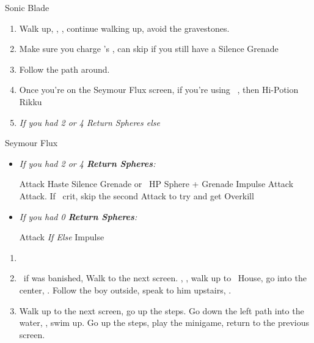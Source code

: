 \begin{multicols}{2}
\begin{equip}
  \begin{itemize}
    \auronf Sonic Blade
  \end{itemize}
\end{equip}
\begin{enumerate}[resume]
  \item Walk up, \sd, \cs[1:20], continue walking up, avoid the gravestones.
  \item Make sure you charge \rikku's \od, can skip if you still have a Silence Grenade
  \item Follow the path around.
  \item Once you're on the Seymour Flux screen, if you're using \rikku\ \od, then Hi-Potion Rikku
   \item \formation{\tidus}{\yuna}{\auron} \textit{If you had 2 or 4 Return Spheres else } \formation{\tidus}{\kimahri}{\wakka}
\end{enumerate}
\begin{battle}[70000]{Seymour Flux}
  \begin{itemize}
    \item \textit{If you had 2 or 4 \textbf{Return Spheres}:}
          \begin{itemize}
            \yunaf Attack
            \tidusf Haste \yuna
            \switch{\auron}{\rikku}
            \rikkuf Silence Grenade or \od\ HP Sphere + Grenade
            \summon{\bahamut}
            \bahamutf Impulse
            \yunaf Attack
            \tidusf Attack. If \yuna\ crit, skip the second Attack to try and get Overkill
          \end{itemize}
    \item \textit{If you had 0 \textbf{Return Spheres}:}
          \begin{itemize}
            \switch{\tidus}{\yuna}
            \summon{\bahamut}
            \bahamutf Attack \textit{If \blitzwin Else} Impulse
          \end{itemize}
  \end{itemize}
\end{battle}
\begin{enumerate}[resume]
  \item \formation{\tidus}{\kimahri}{\auron}
  \item \save\ if \bahamut was banished, Walk to the next screen. \skippablefmv[0:20], \sd, walk up to \tidus\ House, go into the center, \sd. Follow the boy outside, speak to him upstairs, \sd.
  \item Walk up to the next screen, go up the steps. Go down the left path into the water, \sd, swim up. Go up the steps, play the minigame, return to the previous screen.

\end{enumerate}
\end{multicols}
